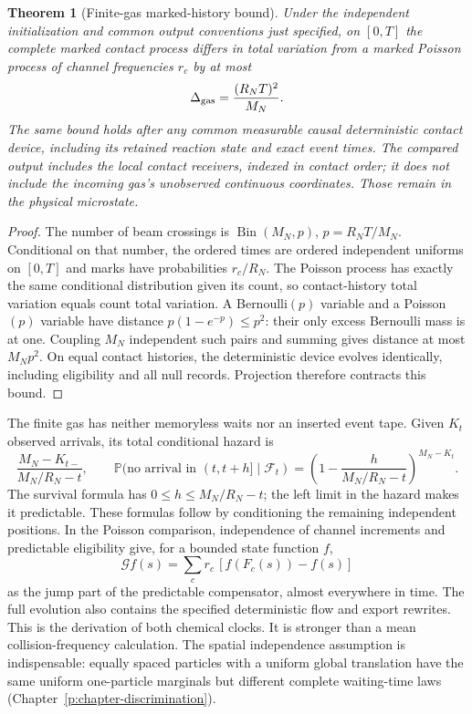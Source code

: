 \documentclass[11pt,oneside,openany]{book}
\newtheorem{theorem}{Theorem}[chapter]
\theoremstyle{definition}
\theoremstyle{remark}\newtheorem{remark}[theorem]{Remark}
\providecommand{\Prb}{\mathbb P}
\begin{document}
\begin{theorem}[Finite-gas marked-history bound]\label{p:gas}
Under the independent initialization and common output conventions just specified, on $[0,T]$ the complete marked contact process differs in total variation from a marked Poisson process of channel frequencies $r_c$ by at most
\begin{equation}
 \Delta_{\rm gas}=\frac{(R_NT)^2}{M_N}.
 \label{p:eq-gaserror}
\end{equation}
The same bound holds after any common measurable causal deterministic contact device, including its retained reaction state and exact event times. The compared output includes the local contact receivers, indexed in contact order; it does not include the incoming gas's unobserved continuous coordinates. Those remain in the physical microstate.
\end{theorem}
\begin{proof}
The number of beam crossings is $\operatorname{Bin}(M_N,p)$, $p=R_NT/M_N$. Conditional on that number, the ordered times are ordered independent uniforms on $[0,T]$ and marks have probabilities $r_c/R_N$. The Poisson process has exactly the same conditional distribution given its count, so contact-history total variation equals count total variation. A Bernoulli$(p)$ variable and a Poisson$(p)$ variable have distance $p(1-e^{-p})\le p^2$: their only excess Bernoulli mass is at one. Coupling $M_N$ independent such pairs and summing gives distance at most $M_Np^2$. On equal contact histories, the deterministic device evolves identically, including eligibility and all null records. Projection therefore contracts this bound.
\end{proof}
The finite gas has neither memoryless waits nor an inserted event tape. Given $K_t$ observed arrivals, its total conditional hazard is
\[
 \frac{M_N-K_{t-}}{M_N/R_N-t},
 \qquad
 \Prb(\text{no arrival in }(t,t+h]\mid\mathcal F_t)
  =\left(1-\frac{h}{M_N/R_N-t}\right)^{M_N-K_t}.
\]
The survival formula has $0\le h\le M_N/R_N-t$; the left limit in the hazard makes it predictable. These formulas follow by conditioning the remaining independent positions. In the Poisson comparison, independence of channel increments and predictable eligibility give, for a bounded state function $f$,
\begin{equation}
 \mathcal Gf(s)=\sum_c r_c\,[f(F_c(s))-f(s)]
 \label{p:eq-generator}
\end{equation}
as the jump part of the predictable compensator, almost everywhere in time. The full evolution also contains the specified deterministic flow and export rewrites. This is the derivation of both chemical clocks. It is stronger than a mean collision-frequency calculation. The spatial independence assumption is indispensable: equally spaced particles with a uniform global translation have the same uniform one-particle marginals but different complete waiting-time laws (Chapter~\ref{p:chapter-discrimination}).
\end{document}
